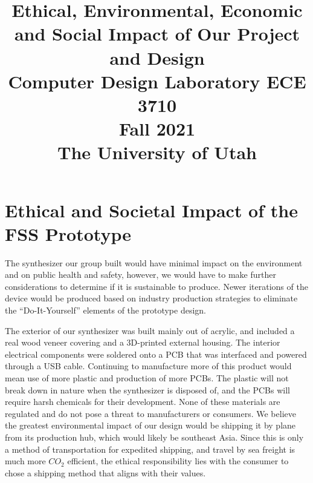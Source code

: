 \documentclass[conference]{IEEEtran}
\begin{document}
\title{Ethical, Environmental, Economic and Social Impact of Our Project and Design\\[10pt]
\Large{Computer Design Laboratory ECE 3710}\\
\Large{Fall 2021}\\
\Large{The University of Utah}}

\author{
\and
{}
\and
{}
\and
{}
}

\maketitle

\section{Ethical and Societal Impact of the FSS Prototype}
The synthesizer our group built would have minimal impact on the environment and on public health and safety, however, we would have to make further considerations to determine if it is sustainable to produce. Newer iterations of the device would be produced based on industry production strategies to eliminate the ``Do-It-Yourself'' elements of the prototype design.

The exterior of our synthesizer was built mainly out of acrylic, and included a real wood veneer covering and a 3D-printed external housing. The interior electrical components were soldered onto a PCB that was interfaced and powered through a USB cable. Continuing to manufacture more of this product would mean use of more plastic and production of more PCBs. The plastic will not break down in nature when the synthesizer is disposed of, and the PCBs will require harsh chemicals for their development. None of these materials are regulated and do not pose a threat to manufacturers or consumers. We believe the greatest environmental impact of our design would be shipping it by plane from its production hub, which would likely be southeast Asia. Since this is only a method of transportation for expedited shipping, and travel by sea freight is much more $CO_2$ efficient, the ethical responsibility lies with the consumer to chose a shipping method that aligns with their values.
\end{document}
